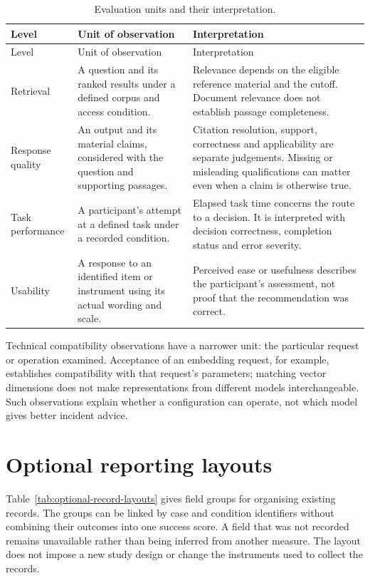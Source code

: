 \begin{longtable}{@{}>{\raggedright\arraybackslash}p{}>{\raggedright\arraybackslash}p{}>{\raggedright\arraybackslash}p{}@{}}
\caption{Evaluation units and their interpretation.}\label{tab:evaluation-record-units}\\
\toprule
Level & Unit of observation & Interpretation \\
\midrule
\endfirsthead
\toprule
Level & Unit of observation & Interpretation \\
\midrule
\endhead
Retrieval & A question and its ranked results under a defined corpus and access condition. & Relevance depends on the eligible reference material and the cutoff. Document relevance does not establish passage completeness. \\
Response quality & An output and its material claims, considered with the question and supporting passages. & Citation resolution, support, correctness and applicability are separate judgements. Missing or misleading qualifications can matter even when a claim is otherwise true. \\
Task performance & A participant's attempt at a defined task under a recorded condition. & Elapsed task time concerns the route to a decision. It is interpreted with decision correctness, completion status and error severity. \\
Usability & A response to an identified item or instrument using its actual wording and scale. & Perceived ease or usefulness describes the participant's assessment, not proof that the recommendation was correct. \\
\bottomrule
\end{longtable}

Technical compatibility observations have a narrower unit: the particular request or operation examined. Acceptance of an embedding request, for example, establishes compatibility with that request's parameters; matching vector dimensions does not make representations from different models interchangeable. Such observations explain whether a configuration can operate, not which model gives better incident advice.

\section{Optional reporting layouts}
Table~\ref{tab:optional-record-layouts} gives field groups for organising existing records. The groups can be linked by case and condition identifiers without combining their outcomes into one success score. A field that was not recorded remains unavailable rather than being inferred from another measure. The layout does not impose a new study design or change the instruments used to collect the records.

